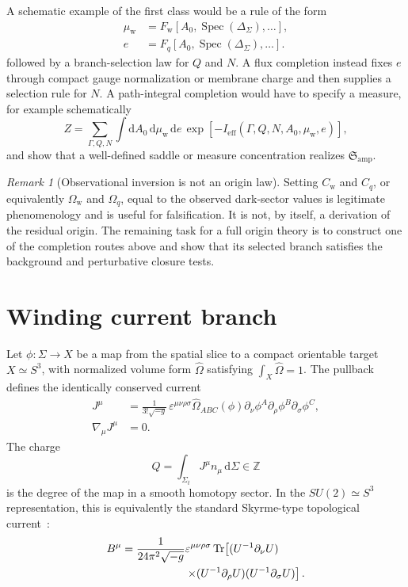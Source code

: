 \documentclass[
  aps,
  prd,
  reprint,
  superscriptaddress,
  floatfix,
  nofootinbib,
  longbibliography
]{revtex4-2}
\theoremstyle{plain}
\theoremstyle{definition}
\theoremstyle{remark}
\newtheorem{remark}[theorem]{Remark}
\newcommand{\dd}{\mathrm d}
\newcommand{\w}{\mathrm w}
\newcommand{\eff}{\mathrm{eff}}
\newcommand{\amp}{\mathrm{amp}}
\newcommand{\Spec}{\operatorname{Spec}}
\newcommand{\Tr}{\operatorname{Tr}}
\newcommand{\Z}{\mathbb Z}
\begin{document}
A schematic example of the first class would be a rule of the form
\begin{equation}
\begin{aligned}
\mu_{\w}&=F_{\w}[A_0,\Spec(\Delta_\Sigma),\ldots],\\
e&=F_q[A_0,\Spec(\Delta_\Sigma),\ldots].
\end{aligned}
\end{equation}
followed by a branch-selection law for \(Q\) and \(N\).  A flux completion
instead fixes \(e\) through compact gauge normalization or membrane charge and
then supplies a selection rule for \(N\).  A path-integral completion would have
to specify a measure, for example schematically
\begin{equation}
Z=\sum_{\Gamma,Q,N}\int \dd A_0\,\dd\mu_{\w}\,\dd e\,
\exp[-I_{\eff}(\Gamma,Q,N,A_0,\mu_{\w},e)],
\end{equation}
and show that a well-defined saddle or measure concentration realizes
\(\mathfrak S_{\amp}\).

\begin{remark}[Observational inversion is not an origin law]
Setting \(C_{\w}\) and \(C_q\), or equivalently \(\Omega_{\w}\) and \(\Omega_q\),
equal to the observed dark-sector values is legitimate phenomenology and is
useful for falsification.  It is not, by itself, a derivation of the residual
origin.  The remaining task for a full origin theory is to construct one of the
completion routes above and show that its selected branch satisfies the
background and perturbative closure tests.
\end{remark}

\section{Winding current branch}

Let \(\phi:\Sigma\to X\) be a map from the spatial slice to a compact orientable target \(X\simeq S^3\), with normalized volume form \(\widehat\Omega\) satisfying \(\int_X\widehat\Omega=1\).  The pullback defines the identically conserved current
\begin{align}
J^\mu
&=
\frac{1}{3!\sqrt{-g}}\,
\varepsilon^{\mu\nu\rho\sigma}
\widehat\Omega_{ABC}(\phi)
\partial_\nu\phi^A
\partial_\rho\phi^B
\partial_\sigma\phi^C,
\label{eq:topological_current_general}\\
\nabla_\mu J^\mu&=0 .
\nonumber
\end{align}
The charge
\begin{equation}
Q=\int_{\Sigma_t}J^\mu n_\mu\,\dd\Sigma\in\Z
\label{eq:winding_charge}
\end{equation}
is the degree of the map in a smooth homotopy sector.  In the \(SU(2)\simeq S^3\) representation, this is equivalently the standard Skyrme-type topological current~\cite{Skyrme}:
\begin{align}
B^\mu
&=
\frac{1}{24\pi^2\sqrt{-g}}
\varepsilon^{\mu\nu\rho\sigma}
\Tr\!\left[
(U^{-1}\partial_\nu U)
\right.
\nonumber\\
&\hspace{2.0cm}\left.
\times
(U^{-1}\partial_\rho U)
(U^{-1}\partial_\sigma U)
\right].
\label{eq:skyrme_current}
\end{align}
\end{document}
